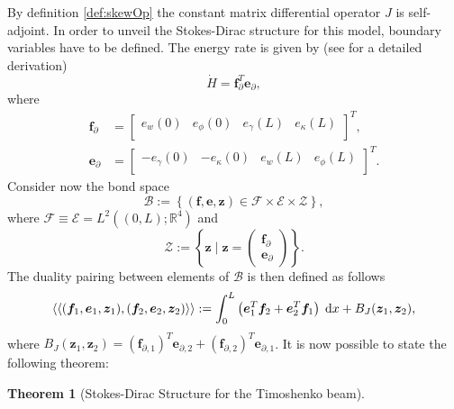 \documentclass[preprint,12pt]{elsarticle}
\newcommand{\RevOne}[1]{\textcolor{blue!80!black}{#1}}
\newtheorem{theorem}{Theorem}
\begin{document}
\RevOne{By definition \ref{def:skewOp} the constant matrix differential operator $J$ is self-adjoint. In order to unveil the Stokes-Dirac structure for this model, boundary variables have to be defined. The energy rate is given by (see \cite{BookZwart} for a detailed derivation)
\begin{equation}
\dot{H} = \bm{f}_{\partial}^T \bm{e}_{\partial},
\end{equation}
where 
\begin{equation}
\begin{aligned}
\bm{f}_{\partial} &= 
\begin{bmatrix}
e_w(0) & e_{\phi}(0) & e_{\gamma}(L) & e_{\kappa}(L) \\
\end{bmatrix}^T, \\
\bm{e}_{\partial} &= 
\begin{bmatrix}
-e_{\gamma}(0) & -e_{\kappa}(0) & e_{w}(L) & e_{\phi}(L) \\
\end{bmatrix}^T.
\end{aligned}
\end{equation}
Consider now the bond space
\begin{equation}
\label{eq:bondTimo}
\mathcal{B} := \left\{(\bm{f}, \bm{e}, \bm{z}) \in \mathcal{F} \times \mathcal{E} \times \mathcal{Z} \right\},
\end{equation}
where $\mathcal{F} \equiv \mathcal{E} =  L^2( (0, L); \mathbb{R}^4)$ and
\begin{equation}
\mathcal{Z} := \left\{ \bm{z} \; \vert \; \bm{z} = \begin{pmatrix} \bm{f}_{\partial} \\ \bm{e}_{\partial} \end{pmatrix} \right\}.
\end{equation}
The duality pairing between elements of $\mathcal{B}$ is then defined as follows
\begin{equation}
\label{eq:bil_Timo}
\left\langle \left\langle (\bm{f}_1, \bm{e}_1, \bm{z}_1), (\bm{f}_2, \bm{e}_2, \bm{z}_2) \right\rangle \right\rangle :=  \int_{0}^L \left( \bm{e}_1^T \bm{f}_2 + \bm{e}_2^T \bm{f}_1 \right) \d{x} + B_J(\bm{z}_1, \bm{z}_2) , 
\end{equation}
where $B_J(\bm{z}_1, \bm{z}_2) = (\bm{f}_{\partial, 1})^T \bm{e}_{\partial, 2} + (\bm{f}_{\partial, 2}) ^T \bm{e}_{\partial, 1}$. It is now possible to state the following theorem:
\begin{theorem}[Stokes-Dirac Structure for the Timoshenko beam]

\end{theorem}}
\end{document}
